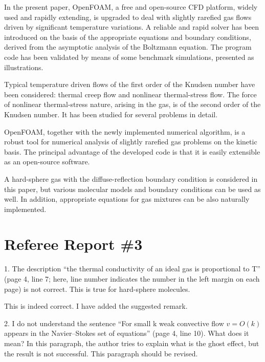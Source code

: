 \documentclass{article}
\begin{document}
\begin{leftbar}
In the present paper, OpenFOAM\textregistered{}, a free and open-source CFD platform,
widely used and rapidly extending, is upgraded to deal with
slightly rarefied gas flows driven by significant temperature variations.
A reliable and rapid solver has been introduced on the basis of the appropriate
equations and boundary conditions, derived from the asymptotic analysis of the Boltzmann equation.
The program code has been validated by means of some benchmark simulations,
presented as illustrations.

Typical temperature driven flows of the first order of the Knudsen number have been considered:
thermal creep flow and nonlinear thermal-stress flow.
The force of nonlinear thermal-stress nature, arising in the gas, is of the second order of
the Knudsen number. It has been studied for several problems in detail.

OpenFOAM\textregistered{}, together with the newly implemented numerical algorithm,
is a robust tool for numerical analysis of slightly rarefied gas problems
on the kinetic basis. The principal advantage of the developed code is that
it is easily extensible as an open-source software.

A hard-sphere gas with the diffuse-reflection boundary condition is considered in this paper,
but various molecular models and boundary conditions can be used as well.
In addition, appropriate equations for gas mixtures can be also naturally implemented.
\end{leftbar}

\section{Referee Report \#3}

\begin{quoting}
1. The description ``the thermal conductivity of an ideal gas is
proportional to T'' (page 4, line 7; here, line number indicates the
number in the left margin on each page) is not correct. This is true for
hard-sphere molecules.
\end{quoting}

This is indeed correct. I have added the suggested remark.

\begin{quoting}
2. I do not understand the sentence ``For small k weak convective flow \(v
= O(k)\) appears in the Navier--Stokes set of equations'' (page 4, line 10).
What does it mean? In this paragraph, the author tries to explain what
is the ghost effect, but the result is not successful. This paragraph
should be revised.
\end{quoting}
\end{document}
